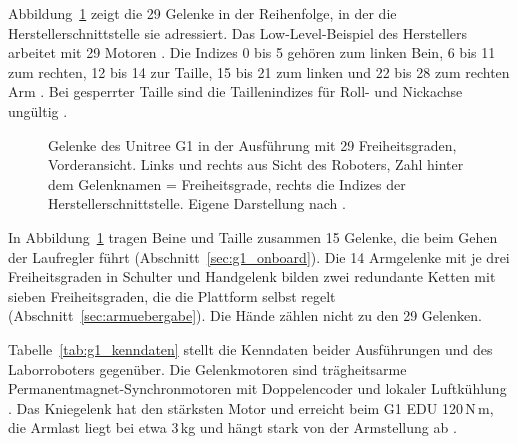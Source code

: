 Abbildung~\ref{fig:g1_kinematik} zeigt die 29 Gelenke in der Reihenfolge, in der die Herstellerschnittstelle sie adressiert.
Das Low-Level-Beispiel des Herstellers arbeitet mit 29 Motoren .
Die Indizes 0 bis 5 gehören zum linken Bein, 6 bis 11 zum rechten, 12 bis 14 zur Taille, 15 bis 21 zum linken und 22 bis 28 zum rechten Arm .
Bei gesperrter Taille sind die Taillenindizes für Roll- und Nickachse ungültig .

\begin{figure}[htbp]
  \centering
  
  \caption[Gelenke des Unitree G1 in der Ausführung mit 29 Freiheitsgraden]{Gelenke des Unitree G1 in der Ausführung mit 29 Freiheitsgraden, Vorderansicht. Links und rechts aus Sicht des Roboters, Zahl hinter dem Gelenknamen = Freiheitsgrade, rechts die Indizes der Herstellerschnittstelle. Eigene Darstellung nach .}
  \label{fig:g1_kinematik}
\end{figure}

In Abbildung~\ref{fig:g1_kinematik} tragen Beine und Taille zusammen 15 Gelenke, die beim Gehen der Laufregler führt (Abschnitt~\ref{sec:g1_onboard}).
Die 14 Armgelenke mit je drei Freiheitsgraden in Schulter und Handgelenk bilden zwei redundante Ketten mit sieben Freiheitsgraden, die die Plattform selbst regelt (Abschnitt~\ref{sec:armuebergabe}).
Die Hände zählen nicht zu den 29 Gelenken.

Tabelle~\ref{tab:g1_kenndaten} stellt die Kenndaten beider Ausführungen und des Laborroboters gegenüber.
Die Gelenkmotoren sind trägheitsarme Permanentmagnet-Synchronmotoren mit Doppel\-encoder und lokaler Luftkühlung .
Das Kniegelenk hat den stärksten Motor und erreicht beim G1 EDU 120\,N\,m, die Armlast liegt bei etwa 3\,kg und hängt stark von der Armstellung ab .

